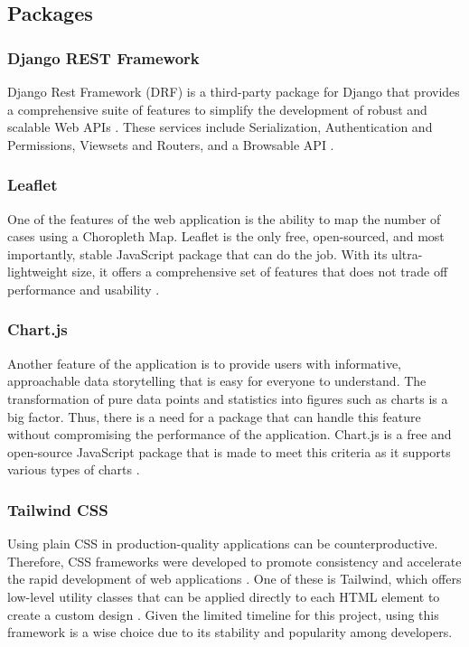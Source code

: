 \subsection{Packages}

\subsubsection{Django REST Framework}
Django Rest Framework (DRF) is a third-party package for Django that provides a comprehensive suite of features to simplify the development of robust and scalable Web APIs \cite{christie-no-date}. These services include Serialization, Authentication and Permissions, Viewsets and Routers, and a Browsable API . 

\subsubsection{Leaflet}
One of the features of the web application is the ability to map the number of cases using a Choropleth Map. Leaflet is the only free, open-sourced, and most importantly, stable JavaScript package that can do the job. With its ultra-lightweight size, it offers a comprehensive set of features that does not trade off performance and usability \cite{leaflet-no-date}. 

\subsubsection{Chart.js}
Another feature of the application is to provide users with informative, approachable data storytelling that is easy for everyone to understand. The transformation of pure data points and statistics into figures such as charts is a big factor. Thus, there is a need for a package that can handle this feature without compromising the performance of the application. Chart.js is a free and open-source JavaScript package that is made to meet this criteria as it supports various types of charts \cite{chartjs-no-date}. 

\subsubsection{Tailwind CSS}
Using plain CSS in production-quality applications can be counterproductive. Therefore, CSS frameworks were developed to promote consistency and accelerate the rapid development of web applications \cite{joel-2021}. One of these is Tailwind, which offers low-level utility classes that can be applied directly to each HTML element to create a custom design \cite{tailwind-no-date}. Given the limited timeline for this project, using this framework is a wise choice due to its stability and popularity among developers.


